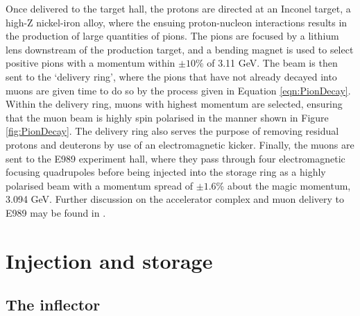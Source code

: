 Once delivered to the target hall, the protons are directed at an Inconel target, a high-Z nickel-iron alloy, where the ensuing proton-nucleon interactions results in the production of large quantities of pions. The pions are focused by a lithium lens downstream of the production target, and a bending magnet is used to select positive pions with a momentum within $\pm10$\% of 3.11 GeV. The beam is then sent to the `delivery ring', where the pions that have not already decayed into muons are given time to do so by the process given in Equation \ref{eqn:PionDecay}. Within the delivery ring, muons with highest momentum are selected, ensuring that the muon beam is highly spin polarised in the manner shown in Figure \ref{fig:PionDecay}. The delivery ring also serves the purpose of removing residual protons and deuterons by use of an electromagnetic kicker. Finally, the muons are sent to the E989 experiment hall, where they pass through four electromagnetic focusing quadrupoles before being injected into the storage ring as a highly polarised beam with a momentum spread of $\pm1.6$\% \cite{BeamDynamics} about the magic momentum, 3.094 GeV. Further discussion on the accelerator complex and muon delivery to E989 may be found in \cite{FermilabBeamline}.




\section{Injection and storage}\label{sec:InjectionAndStorage}

\subsection{The inflector}

